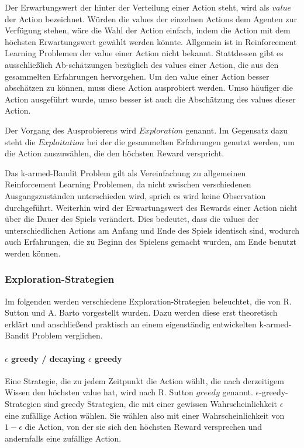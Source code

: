 \documentclass[11pt]{scrartcl}
\begin{document}
Der Erwartungswert der hinter der Verteilung einer Action steht, wird als $value$ der Action
bezeichnet. Würden die values der einzelnen Actions dem Agenten zur Verfügung stehen, wäre die 
Wahl der Action einfach, indem die Action mit dem höchsten Erwartungswert gewählt werden 
könnte. Allgemein ist in Reinforcement Learning Problemen der value einer Action nicht bekannt.
Stattdessen gibt es ausschließlich Ab-schätzungen bezüglich des values einer Action, die aus den
gesammelten Erfahrungen hervorgehen. Um den value einer Action besser abschätzen zu können,
muss diese Action ausprobiert werden. Umso häufiger die Action ausgeführt wurde, umso besser
ist auch die Abschätzung des values dieser Action.

Der Vorgang des Ausprobierens wird $Exploration$ genannt. Im Gegensatz dazu steht die
$Exploitation$ bei der die gesammelten Erfahrungen genutzt werden, um die Action
auszuwählen, die den höchsten Reward verspricht.

Das k-armed-Bandit Problem gilt als Vereinfachung zu allgemeinen Reinforcement Learning
Problemen, da nicht zwischen verschiedenen Ausgangszuständen unterschieden wird, sprich
es wird keine Observation durchgeführt. Weiterhin wird der Erwartungswert des
Rewards einer Action nicht über die Dauer des Spiels verändert. Dies bedeutet, dass die
values der unterschiedlichen Actions am Anfang und Ende des Spiels identisch sind, wodurch
auch Erfahrungen, die zu Beginn des Spielens gemacht wurden, am Ende benutzt werden
können.

\subsubsection{Exploration-Strategien}
Im folgenden werden verschiedene Exploration-Strategien beleuchtet, die von R. Sutton und
A. Barto \cite[~S.19]{SB1998} vorgestellt wurden. Dazu werden diese erst theoretisch
erklärt und anschließend praktisch an einem eigenständig entwickelten k-armed-Bandit
Problem verglichen.

\paragraph{$\epsilon$ greedy / decaying $\epsilon$ greedy}
Eine Strategie, die zu jedem Zeitpunkt die Action wählt, die nach derzeitigem Wissen den
höchsten value hat, wird nach R. Sutton \cite[~S.20]{SB1998} $greedy$ genannt.
$\epsilon$-greedy-Strategien sind greedy Strategien, die mit einer gewissen
Wahrscheinlichkeit $\epsilon$ eine zufällige Action wählen. Sie wählen also mit einer
Wahrscheinlichkeit von $1 - \epsilon$ die Action, von der sie sich den höchsten Reward
versprechen und andernfalls eine zufällige Action.
\end{document}

